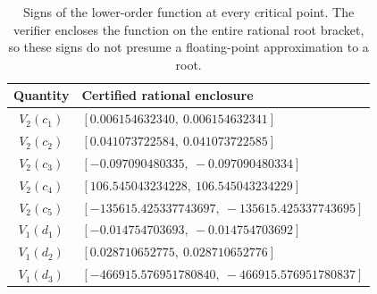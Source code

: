 \begin{table}[htbp]
\centering
\small
\begin{tabular}{cl}
\toprule
Quantity&Certified rational enclosure\\
\midrule
$V_2(c_1)$&$[0.006154632340,\ 0.006154632341]$\\
$V_2(c_2)$&$[0.041073722584,\ 0.041073722585]$\\
$V_2(c_3)$&$[-0.097090480335,\ -0.097090480334]$\\
$V_2(c_4)$&$[106.545043234228,\ 106.545043234229]$\\
$V_2(c_5)$&$[-135615.425337743697,\ -135615.425337743695]$\\
\midrule
$V_1(d_1)$&$[-0.014754703693,\ -0.014754703692]$\\
$V_1(d_2)$&$[0.028710652775,\ 0.028710652776]$\\
$V_1(d_3)$&$[-466915.576951780840,\ -466915.576951780837]$\\
\bottomrule
\end{tabular}
\caption{Signs of the lower-order function at every critical point.
The verifier encloses the function on the entire rational root bracket,
so these signs do not presume a floating-point approximation to a root.}
\label{n5:tab:critical}
\end{table}

